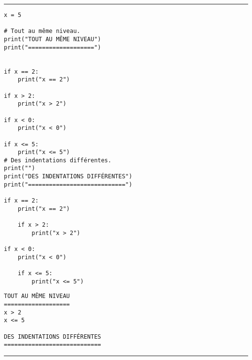 \bigskip
{\hrule height .5mm}
\begin{verbatim}
x = 5

# Tout au même niveau.
print("TOUT AU MÊME NIVEAU")
print("===================")


if x == 2:
    print("x == 2")

if x > 2:
    print("x > 2")

if x < 0:
    print("x < 0")

if x <= 5:
    print("x <= 5")
# Des indentations différentes.
print("")
print("DES INDENTATIONS DIFFÉRENTES")
print("============================")

if x == 2:
    print("x == 2")

    if x > 2:
        print("x > 2")

if x < 0:
    print("x < 0")

    if x <= 5:
        print("x <= 5")
\end{verbatim}
 \color{ForestGreen}
\vspace{-1.5em}
\begin{verbatim}
TOUT AU MÊME NIVEAU
===================
x > 2
x <= 5

DES INDENTATIONS DIFFÉRENTES
============================
\end{verbatim} \color{Black}
{\hrule height .5mm}
\bigskip